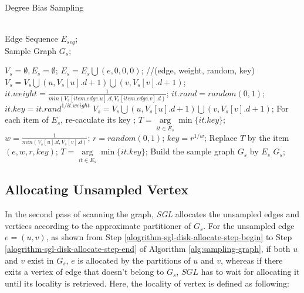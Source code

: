\documentclass{sig-alternate-2013}
\begin{document}
\begin{algorithm}[h]
\renewcommand{\algorithmicrequire}{\textbf{Input:}}
\renewcommand\algorithmicensure {\textbf{Output:} }
\caption{Degree Bias Sampling}
\label{alg:degree-bias-sampling}
\begin{algorithmic}[1]
\REQUIRE ~~\\ %
Edge Sequence $E_{seq}$;
\ENSURE ~~\\ %
Sample Graph $G_s$;

\STATE $V_s=\emptyset,E_s=\emptyset$;
  \STATE $E_s=E_s \bigcup (e, 0,0,0)$; //(edge, weight, random, key)
  \STATE $V_s=V_s \bigcup (u, V_s[u].d+1)\bigcup (v, V_s[v].d+1)$;
\ENDFOR
{}
 \STATE $it.weight = \frac{1}{min(V_s[item.edge.u].d,V_s[item.edge.v].d)}$;
 \STATE $it.rand = random(0,1)$;
 \STATE $it.key = it.rand^{1/it.weight}$
\ENDFOR
\REPEAT
    \STATE $V_s=V_s \bigcup (u, V_s[u].d+1)\bigcup (v, V_s[v].d+1)$;
  \ENDFOR
  \STATE For each item of $E_s$, re-caculate its key ;
  \STATE $T =\underset{it\in{E_s}} \arg \min \{ it.key\}$;
    \STATE $w =\frac{1}{min(V_s[u].d,V_s[v].d)}$;
    \STATE $r= random(0,1)$;
    \STATE $key = r^{1/w}$;
      \STATE Replace $T$ by the item $(e, w, r, key)$;
      \STATE $T =\underset{it\in{E_s}} \arg \min \{ it.key\}$;
   \ENDIF
  \ENDFOR
{}
\STATE Build the sample graph $G_s$ by $E_s$
\RETURN  $G_s$;
\end{algorithmic}
\end{algorithm}

\subsection{Allocating Unsampled Vertex}
In the second pass of scanning the graph, \textit{SGL} allocates the unsampled edges and vertices according to the approximate partitioner of $G_s$. For the unsampled edge $e=(u, v)$, as shown from Step \ref{alogrithm-sgl-disk-allocate-step-begin} to Step \ref{alogrithm-sgl-disk-allocate-step-end} of Algorithm \ref{alg:sampling-graph}, if both $u$ and $v$ exist in $G_s$, $e$ is allocated by the partitions of $u$ and $v$, whereas if there exits a vertex of edge that doesn't belong to $G_s$, $SGL$ has to wait for allocating it until its locality is retrieved. Here, the locality of vertex is defined as following:
\end{document}
